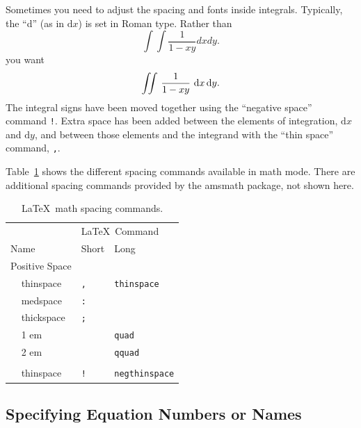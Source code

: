 \documentclass{icmmcm}
\newcommand{\bslash}{\symbol{'134}}%
\newcommand{\bsl}{{\texttt{\bslash}}}
\newcommand{\com}[1]{\bsl\texttt{#1}\xspace}
\newcommand{\package}[1]{\textsf{#1}\xspace}
\begin{document}
{Sometimes you need to adjust the spacing and fonts inside integrals.
Typically, the ``d'' (as in $\textrm{d}x$) is set in Roman type.
Rather than
\begin{equation} 
\int \int \frac{1}{1-xy} dx dy.
\end{equation}
you want
\begin{equation}
\int \! \! \! \int \, \frac{1}{1-xy} \, \, {\rm d}x \, {\rm d}y.
\end{equation}
The integral signs have been moved together using the ``negative
space'' command \com{!}.  Extra space has been added between the
elements of integration, $\textrm{d}x$ and $\textrm{d}y$, and between
those elements and the integrand with the ``thin space'' command,
\com{,}.

Table~\ref{tab:math-spacing} shows the different spacing commands
available in math mode.  There are additional spacing commands
provided by the \package{amsmath} package, not shown here.
\begin{table}[htbp]
  \centering
  \begin{tabular}{llll}
    \toprule
            &                &\multicolumn{2}{l}{\LaTeX\ Command}\\
    \cmidrule(l){3-4}
    \multicolumn{2}{l}{Name} &  Short   & Long                   \\
    \midrule
     \multicolumn{2}{l}{Positive Space}                          \\
     \quad{}& thinspace      &  \com{,} & \com{thinspace}        \\
            & medspace       &  \com{:}                          \\
            & thickspace     &  \com{;}                          \\
            & 1 em           &          & \com{quad}             \\
            & 2 em           &          & \com{qquad}            \\
    \addlinespace
    \multicolumn{2}{l}{Negative Space}                           \\
            & thinspace      &  \com{!} & \com{negthinspace}     \\
    \bottomrule
  \end{tabular}
  \caption[\protect\LaTeX\ math spacing commands]{\protect\LaTeX\ math spacing commands.}%
  \label{tab:math-spacing}  
\end{table}


\subsection{Specifying Equation Numbers or Names}%
\label{sec:specifying-eq-numbers}

}
\end{document}
